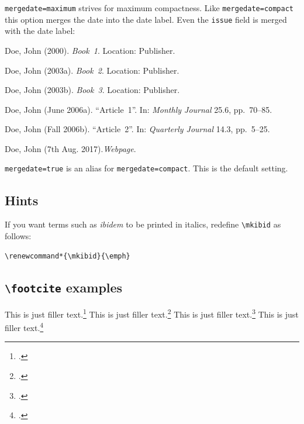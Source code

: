 \documentclass[a4paper]{article}
\newcommand{\cmd}[1]{\texttt{\textbackslash #1}}
\newenvironment{bibsample}
  {\trivlist\samepage
   \setlength{\itemsep}{0pt}}
  {\endtrivlist}
\begin{document}
\texttt{mergedate=maximum} strives for maximum compactness.
Like \texttt{mergedate=compact} this option merges the date
into the date label.
Even the \texttt{issue} field is merged with the date label:

\begin{bibsample}
\item Doe, John (2000). \emph{Book~1}. Location: Publisher.
\item Doe, John (2003a). \emph{Book~2}. Location: Publisher.
\item Doe, John (2003b). \emph{Book~3}. Location: Publisher.
\item Doe, John (June 2006a). \enquote{Article~1}. In: \emph{Monthly Journal} 25.6, pp.~70--85.
\item Doe, John (Fall 2006b). \enquote{Article~2}. In: \emph{Quarterly Journal} 14.3, pp.~5--25.
\item Doe, John (7th Aug. 2017).\emph{Webpage}.
\end{bibsample}

\texttt{mergedate=true} is an alias for \texttt{mergedate=compact}.
This is the default setting.

\subsection*{Hints}

If you want terms such as \emph{ibidem} to be printed in italics,
redefine \cmd{mkibid} as follows:

\begin{verbatim}
\renewcommand*{\mkibid}{\emph}
\end{verbatim}

\subsection*{\cmd{footcite} examples}

This is just filler text.\footcite{companion}
This is just filler text.\footcite{companion}
\clearpage
This is just filler text.\footcite[55]{companion}
This is just filler text.\footcite[55]{companion}

\clearpage
\printbibliography
\end{document}
